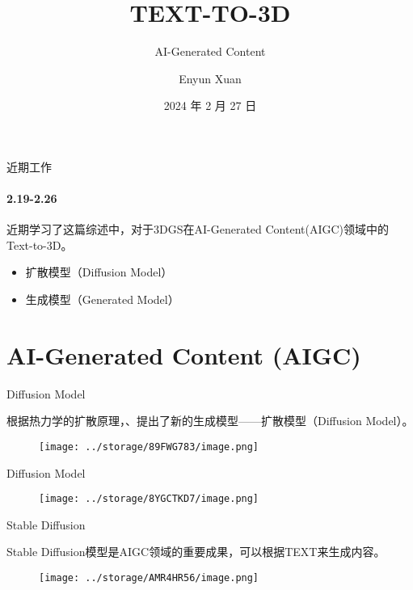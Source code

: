 \documentclass[dark]{sintefbeamer}
\title{TEXT-TO-3D}
\subtitle{AI-Generated Content}
\author{Enyun Xuan}
\date{2024 年 2 月 27 日}
\begin{document}
\maketitle

\begin{frame}{近期工作}
  \framesubtitle{2.19-2.26}

  近期学习了\cite{chenSurvey3DGaussian2024}这篇综述中，对于3DGS在AI-Generated Content(AIGC)领域中的Text-to-3D。

  \begin{itemize}
    \item 扩散模型（Diffusion Model）
    \item 生成模型（Generated Model）
  \end{itemize}

\end{frame}

\section{AI-Generated Content (AIGC)}

\begin{frame}[fragile]{Diffusion Model}{\thesection \, \secname}

  根据热力学的扩散原理，\cite{sohl-dicksteinDeepUnsupervisedLearning2015}、\cite{hoDenoisingDiffusionProbabilistic2020}提出了新的生成模型——扩散模型（Diffusion Model）。

  \begin{figure}
    \texttt{[image: ../storage/89FWG783/image.png]}
      \end{figure}
\end{frame}

\begin{frame}[fragile]{Diffusion Model}{\thesection \, \secname}

  \begin{figure}
    \texttt{[image: ../storage/8YGCTKD7/image.png]}
      \end{figure}
\end{frame}

\begin{frame}[fragile]{Stable Diffusion}{\thesection \, \secname}

  Stable Diffusion\cite{rombachHighResolutionImageSynthesis2022}模型是AIGC领域的重要成果，可以根据TEXT来生成内容。

  \begin{figure}
    \texttt{[image: ../storage/AMR4HR56/image.png]}
  \end{figure}

\end{frame}
\end{document}

